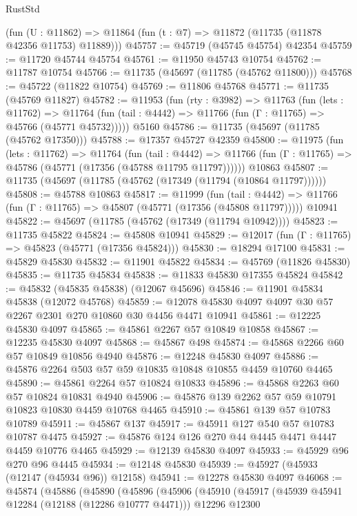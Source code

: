 \begin{lexlean}{RustStd}
\begin{coremodule}
    (fun (U : @11862) => @11864 (fun (t : @7) => @11872 (@11735 (@11878 @42356 @11753) @11889)))
@45757 := @45719 (@45745 @45754) @42354
@45759 := @11720 @45744 @45754
@45761 := @11950 @45743 @10754
@45762 := @11787 @10754
@45766 := @11735 (@45697 (@11785 (@45762 @11800)))
@45768 := @45722 (@11822 @10754)
@45769 := @11806 @45768
@45771 := @11735 (@45769 @11827)
@45782 := @11953
    (fun (rty : @3982) =>
    @11763
      (fun (lets : @11762) =>
      @11764 (fun (tail : @4442) => @11766 (fun (Γ : @11765) => @45766 (@45771 @45732)))))
    @5160
@45786 := @11735 (@45697 (@11785 (@45762 @17350)))
@45788 := @17357 @45727 @42359
@45800 := @11975
    (fun (lets : @11762) =>
    @11764
      (fun (tail : @4442) =>
      @11766 (fun (Γ : @11765) => @45786 (@45771 (@17356 (@45788 @11795 @11797))))))
    @10863
@45807 := @11735 (@45697 (@11785 (@45762 (@17349 (@11794 (@10864 @11797))))))
@45808 := @45788 @10863
@45817 := @11999
    (fun (tail : @4442) => @11766 (fun (Γ : @11765) => @45807 (@45771 (@17356 (@45808 @11797)))))
    @10941
@45822 := @45697 (@11785 (@45762 (@17349 (@11794 @10942))))
@45823 := @11735 @45822
@45824 := @45808 @10941
@45829 := @12017 (fun (Γ : @11765) => @45823 (@45771 (@17356 @45824)))
@45830 := @18294 @17100
@45831 := @45829 @45830
@45832 := @11901 @45822
@45834 := @45769 (@11826 @45830)
@45835 := @11735 @45834
@45838 := @11833 @45830 @17355 @45824
@45842 := @45832 (@45835 @45838) (@12067 @45696)
@45846 := @11901 @45834 @45838 (@12072 @45768)
@45859 := @12078 @45830 @4097 @4097 @30 @57 @2267 @2301 @270 @10860 @30 @4456 @4471 @10941
@45861 := @12225 @45830 @4097
@45865 := @45861 @2267 @57 @10849 @10858
@45867 := @12235 @45830 @4097
@45868 := @45867 @498
@45874 := @45868 @2266 @60 @57 @10849 @10856 @4940
@45876 := @12248 @45830 @4097
@45886 := @45876 @2264 @503 @57 @59 @10835 @10848 @10855 @4459 @10760 @4465
@45890 := @45861 @2264 @57 @10824 @10833
@45896 := @45868 @2263 @60 @57 @10824 @10831 @4940
@45906 := @45876 @139 @2262 @57 @59 @10791 @10823 @10830 @4459 @10768 @4465
@45910 := @45861 @139 @57 @10783 @10789
@45911 := @45867 @137
@45917 := @45911 @127 @540 @57 @10783 @10787 @4475
@45927 := @45876 @124 @126 @270 @44 @4445 @4471 @4447 @4459 @10776 @4465
@45929 := @12139 @45830 @4097
@45933 := @45929 @96 @270 @96 @4445
@45934 := @12148 @45830
@45939 := @45927 (@45933 (@12147 (@45934 @96)) @12158)
@45941 := @12278 @45830 @4097
@46068 := @45874
    (@45886
      (@45890
        (@45896
          (@45906
            (@45910
              (@45917
                (@45939 @45941 @12284 (@12188 (@12286 @10777 @4471)))
                @12296
                @12300

\end{coremodule}
\end{lexlean}
